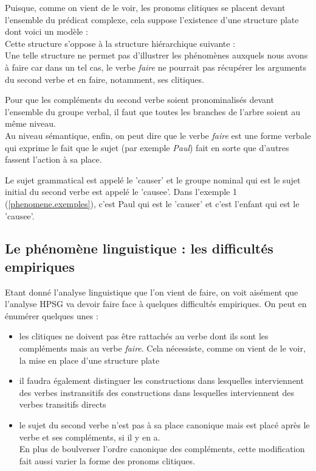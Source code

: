 Puisque, comme on vient de le voir, les pronoms clitiques se placent devant l'ensemble du prédicat complexe, cela suppose l'existence d'une structure plate dont voici un modèle : \\


Cette structure s'oppose à la structure hiérarchique suivante :\\


Une telle structure ne permet pas d'illustrer les phénomènes auxquels nous avons à faire car dans un tel cas, le verbe \emph{faire} ne pourrait pas récupérer les arguments du second verbe et en faire, notamment, ses clitiques.

Pour que les compléments du second verbe soient pronominalisés devant l'ensemble du groupe verbal, il faut que toutes les branches de l'arbre soient au même niveau.\\

Au niveau sémantique, enfin, on peut dire que le verbe \emph{faire} est une forme verbale qui exprime le fait que le sujet (par exemple \emph{Paul}) fait en sorte que d'autres fassent l'action à sa place.

Le sujet grammatical est appelé le 'causer' et le groupe nominal qui est le sujet initial du second verbe est appelé le 'causee'.
Dans l'exemple 1 (\autoref{phenomene.exemples}), c'est Paul qui est le 'causer' et c'est l'enfant qui est le 'causee'.

\newpage

\subsection{Le phénomène linguistique : les difficultés empiriques}

Etant donné l'analyse linguistique que l'on vient de faire, on voit aisément que l'analyse HPSG va devoir faire face à quelques difficultés empiriques.
On peut en énumérer quelques unes :\\

\begin{itemize}
  \item les clitiques ne doivent pas être rattachés au verbe dont ils sont les compléments mais au verbe \emph{faire}.
    Cela nécessiste, comme on vient de le voir, la mise en place d'une structure plate
  \item il faudra également distinguer les constructions dans lesquelles interviennent des verbes instransitifs des constructions dans lesquelles interviennent des verbes transitifs directs
  \item le sujet du second verbe n'est pas à sa place canonique mais est placé après le verbe et ses compléments, si il y en a.\\
    En plus de boulverser l'ordre canonique des compléments, cette modification fait aussi varier la forme des pronoms clitiques.
\end{itemize}

